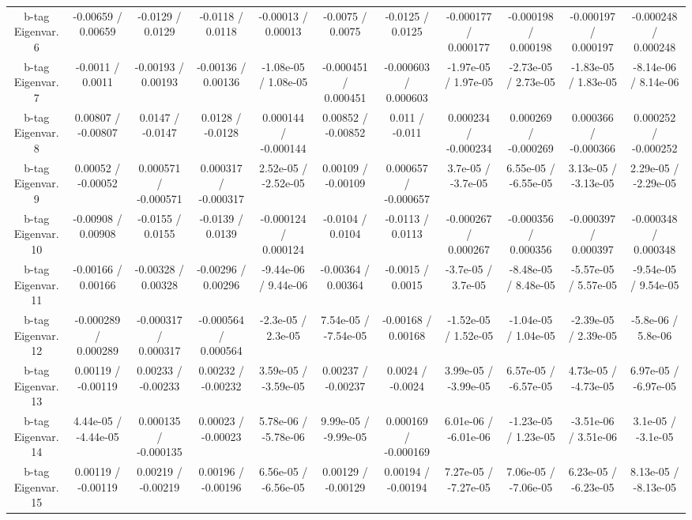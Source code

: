 \begin{table}[htbp]
\begin{center}
\begin{tabular}{|c|c|c|c|c|c|c|c|c|c|c|}
  b-tag Eigenvar. 6 & -0.00659 / 0.00659 & -0.0129 / 0.0129 & -0.0118 / 0.0118 & -0.00013 / 0.00013 & -0.0075 / 0.0075 & -0.0125 / 0.0125 & -0.000177 / 0.000177 & -0.000198 / 0.000198 & -0.000197 / 0.000197 & -0.000248 / 0.000248 \\ 
  b-tag Eigenvar. 7 & -0.0011 / 0.0011 & -0.00193 / 0.00193 & -0.00136 / 0.00136 & -1.08e-05 / 1.08e-05 & -0.000451 / 0.000451 & -0.000603 / 0.000603 & -1.97e-05 / 1.97e-05 & -2.73e-05 / 2.73e-05 & -1.83e-05 / 1.83e-05 & -8.14e-06 / 8.14e-06 \\ 
  b-tag Eigenvar. 8 & 0.00807 / -0.00807 & 0.0147 / -0.0147 & 0.0128 / -0.0128 & 0.000144 / -0.000144 & 0.00852 / -0.00852 & 0.011 / -0.011 & 0.000234 / -0.000234 & 0.000269 / -0.000269 & 0.000366 / -0.000366 & 0.000252 / -0.000252 \\ 
  b-tag Eigenvar. 9 & 0.00052 / -0.00052 & 0.000571 / -0.000571 & 0.000317 / -0.000317 & 2.52e-05 / -2.52e-05 & 0.00109 / -0.00109 & 0.000657 / -0.000657 & 3.7e-05 / -3.7e-05 & 6.55e-05 / -6.55e-05 & 3.13e-05 / -3.13e-05 & 2.29e-05 / -2.29e-05 \\ 
  b-tag Eigenvar. 10 & -0.00908 / 0.00908 & -0.0155 / 0.0155 & -0.0139 / 0.0139 & -0.000124 / 0.000124 & -0.0104 / 0.0104 & -0.0113 / 0.0113 & -0.000267 / 0.000267 & -0.000356 / 0.000356 & -0.000397 / 0.000397 & -0.000348 / 0.000348 \\ 
  b-tag Eigenvar. 11 & -0.00166 / 0.00166 & -0.00328 / 0.00328 & -0.00296 / 0.00296 & -9.44e-06 / 9.44e-06 & -0.00364 / 0.00364 & -0.0015 / 0.0015 & -3.7e-05 / 3.7e-05 & -8.48e-05 / 8.48e-05 & -5.57e-05 / 5.57e-05 & -9.54e-05 / 9.54e-05 \\ 
  b-tag Eigenvar. 12 & -0.000289 / 0.000289 & -0.000317 / 0.000317 & -0.000564 / 0.000564 & -2.3e-05 / 2.3e-05 & 7.54e-05 / -7.54e-05 & -0.00168 / 0.00168 & -1.52e-05 / 1.52e-05 & -1.04e-05 / 1.04e-05 & -2.39e-05 / 2.39e-05 & -5.8e-06 / 5.8e-06 \\ 
  b-tag Eigenvar. 13 & 0.00119 / -0.00119 & 0.00233 / -0.00233 & 0.00232 / -0.00232 & 3.59e-05 / -3.59e-05 & 0.00237 / -0.00237 & 0.0024 / -0.0024 & 3.99e-05 / -3.99e-05 & 6.57e-05 / -6.57e-05 & 4.73e-05 / -4.73e-05 & 6.97e-05 / -6.97e-05 \\ 
  b-tag Eigenvar. 14 & 4.44e-05 / -4.44e-05 & 0.000135 / -0.000135 & 0.00023 / -0.00023 & 5.78e-06 / -5.78e-06 & 9.99e-05 / -9.99e-05 & 0.000169 / -0.000169 & 6.01e-06 / -6.01e-06 & -1.23e-05 / 1.23e-05 & -3.51e-06 / 3.51e-06 & 3.1e-05 / -3.1e-05 \\ 
  b-tag Eigenvar. 15 & 0.00119 / -0.00119 & 0.00219 / -0.00219 & 0.00196 / -0.00196 & 6.56e-05 / -6.56e-05 & 0.00129 / -0.00129 & 0.00194 / -0.00194 & 7.27e-05 / -7.27e-05 & 7.06e-05 / -7.06e-05 & 6.23e-05 / -6.23e-05 & 8.13e-05 / -8.13e-05 \\ 

\end{tabular}
\end{center}
\end{table}
